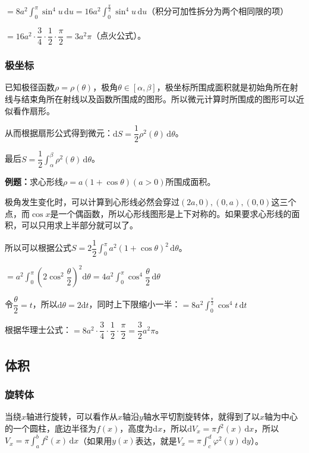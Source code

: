 \documentclass[UTF8, 12pt]{ctexart}
\begin{document}
$=8a^2\int_0^\pi\sin^4u\,\textrm{d}u=16a^2\int_0^{\frac{\pi}{2}}\sin^4u\,\textrm{d}u$（积分可加性拆分为两个相同限的项）

$=16a^2\cdot\dfrac{3}{4}\cdot\dfrac{1}{2}\cdot\dfrac{\pi}{2}=3a^2\pi$（点火公式）。

\subsubsection{极坐标}

已知极径函数$\rho=\rho(\theta)$，极角$\theta\in[\alpha,\beta]$，极坐标所围成面积就是初始角所在射线与结束角所在射线以及函数所围成的图形。所以微元计算时所围成的图形可以近似看作扇形。

从而根据扇形公式得到微元：$\textrm{d}S=\dfrac{1}{2}\rho^2(\theta)\,\textrm{d}\theta$。

最后$S=\dfrac{1}{2}\int_\alpha^\beta\rho^2(\theta)\,\textrm{d}\theta$。

\textbf{例题：}求心形线$\rho=a(1+\cos\theta)(a>0)$所围成面积。

极角发生变化时，可以计算到心形线必然会穿过$(2a,0),(0,a),(0,0)$这三个点，而$\cos x$是一个偶函数，所以心形线图形是上下对称的。如果要求心形线的面积，可以只用求上半部分就可以了。

所以可以根据公式$S=2\dfrac{1}{2}\int_0^\pi a^2(1+\cos\theta)^2\,\textrm{d}\theta$。

$=a^2\displaystyle{\int_0^\pi\left(2\cos^2\dfrac{\theta}{2}\right)^2\textrm{d}\theta}=4a^2\displaystyle{\int_0^\pi\cos^4\dfrac{\theta}{2}\,\textrm{d}\theta}$

令$\dfrac{\theta}{2}=t$，所以$\textrm{d}\theta=2\textrm{d}t$，同时上下限缩小一半：$=8a^2\int_0^{\frac{\pi}{2}}\cos^4t\,\textrm{d}t$

根据华理士公式：$=8a^2\cdot\dfrac{3}{4}\cdot\dfrac{1}{2}\cdot\dfrac{\pi}{2}=\dfrac{3}{2}a^2\pi$。

\subsection{体积}

\subsubsection{旋转体}

当绕$x$轴进行旋转，可以看作从$x$轴沿$y$轴水平切割旋转体，就得到了以$x$轴为中心的一个圆柱，底边半径为$f(x)$，高度为$\textrm{d}x$，所以$\textrm{d}V_x=\pi f^2(x)\,\textrm{d}x$，所以$V_x=\pi\int_a^bf^2(x)\,\textrm{d}x$（如果用$y(x)$表达，就是$V_x=\pi\int_c^d\varphi^2(y)\,\textrm{d}y$）。
\end{document}
